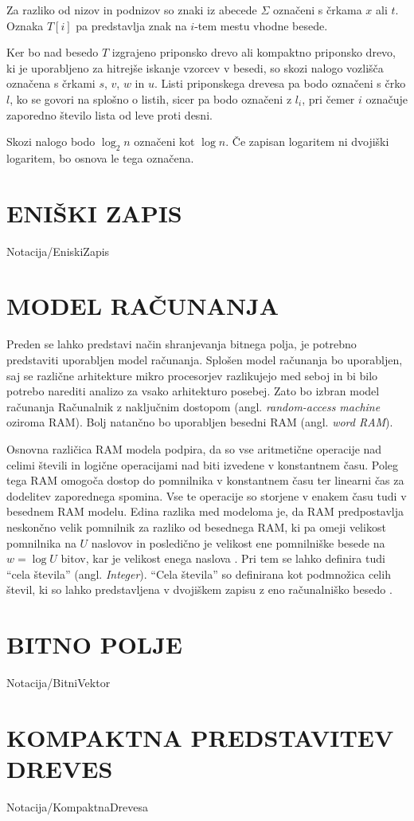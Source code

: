 Za razliko od nizov in podnizov so znaki iz abecede $\Sigma$ označeni s črkama $x$ ali $t$. Oznaka $T[i]$ pa predstavlja znak na $i$-tem mestu vhodne besede.

Ker bo nad besedo $T$ izgrajeno priponsko drevo ali kompaktno priponsko drevo, ki je uporabljeno za hitrejše iskanje vzorcev v besedi, so skozi nalogo vozlišča označena s črkami $s$, $v$, $w$ in $u$. Listi priponskega drevesa pa bodo označeni s črko $l$, ko se govori na splošno o listih, sicer pa bodo označeni z $l_i$, pri čemer $i$ označuje zaporedno število lista od leve proti desni.

Skozi nalogo bodo $\log_2{n}$ označeni kot $\log{n}$. Če zapisan logaritem ni dvojiški logaritem, bo osnova le tega označena.


\section{ENIŠKI ZAPIS}\label{sec:Eniski_Zapis}
{Notacija/EniskiZapis}

\section{MODEL RAČUNANJA}\label{sec:Model_racunanja}
Preden se lahko predstavi način shranjevanja bitnega polja, je potrebno predstaviti uporabljen model računanja. Splošen model računanja bo uporabljen, saj se različne arhitekture mikro procesorjev razlikujejo med seboj in bi bilo potrebo narediti analizo za vsako arhitekturo posebej. Zato bo izbran model računanja Računalnik z naključnim dostopom (angl. \textit{random-access machine} oziroma RAM). Bolj natančno bo uporabljen besedni RAM  (angl. \textit{word RAM}).

Osnovna različica RAM modela podpira, da so vse aritmetične operacije nad celimi števili in logične operacijami nad biti izvedene v konstantnem času. Poleg tega RAM omogoča dostop do pomnilnika v konstantnem času ter linearni čas za dodelitev zaporednega spomina. Vse te operacije so storjene v enakem času tudi v besednem RAM modelu. Edina razlika med modeloma je, da RAM predpostavlja neskončno velik pomnilnik za razliko od besednega RAM, ki pa omeji velikost pomnilnika na $U$ naslovov in posledično je velikost ene pomnilniške besede na $w=\log{U}$ bitov, kar je velikost enega naslova \cite{Fredman1990,Morin2013,Navarro2016}. Pri tem se lahko definira tudi \enquote{cela števila} (angl. \textit{Integer}). \enquote{Cela števila} so definirana kot podmnožica celih števil, ki so lahko predstavljena v dvojiškem zapisu z eno računalniško besedo \cite{Navarro2016}.

\section{BITNO POLJE}\label{sec:Bitno_Polje}
{Notacija/BitniVektor}


\section{KOMPAKTNA PREDSTAVITEV DREVES}\label{sec:kompaktna_drevesa}
{Notacija/KompaktnaDrevesa}